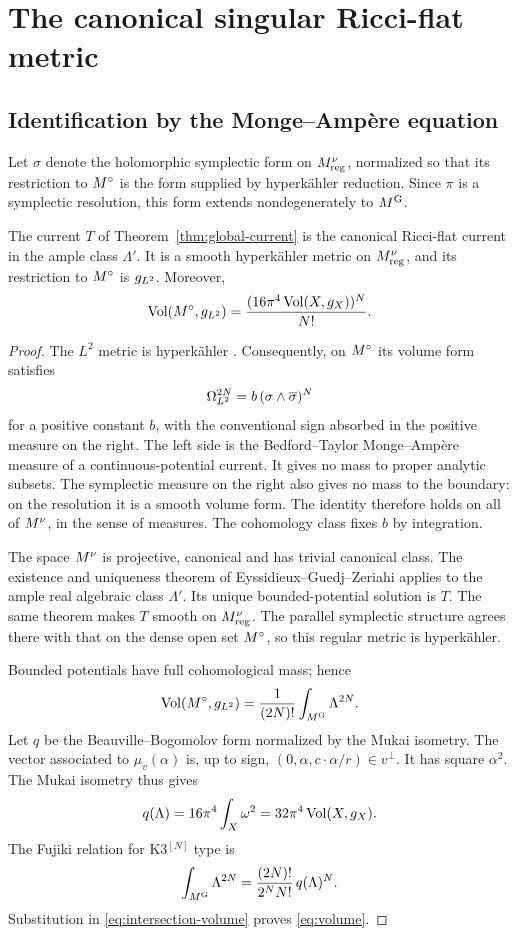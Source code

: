 \section{The canonical singular Ricci-flat metric}\label{sec:canonical}

\subsection{Identification by the Monge--Amp\`ere equation}
Let $\sigma$ denote the holomorphic symplectic form on $M^{\nu}_{\rm reg}$,
normalized so that its restriction to $M^{\circ}$ is the form supplied by
hyperk\"ahler reduction. Since $\pi$ is a symplectic resolution, this form
extends nondegenerately to $M^{\mathrm G}$.

\begin{theorem}\label{thm:canonical}
The current $T$ of Theorem~\ref{thm:global-current} is the canonical
Ricci-flat current in the ample class $\Lambda'$. It is a smooth
hyperk\"ahler metric on $M^{\nu}_{\rm reg}$, and its restriction to $M^{\circ}$ is
$g_{L^2}$. Moreover,
\begin{equation}\label{eq:volume}
 \operatorname{Vol}(M^{\circ},g_{L^2})=\frac{(16\pi^4\operatorname{Vol}(X,g_X))^N}{N!}.
\end{equation}
\end{theorem}
\begin{proof}
The $L^2$ metric is hyperk\"ahler \cite[Theorem~2.1]{Itoh88}. Consequently,
on $M^{\circ}$ its volume form satisfies
\[
 \Omega_{L^2}^{2N}=b\,(\sigma\wedge\overline\sigma)^N
\]
for a positive constant $b$, with the conventional sign absorbed in the
positive measure on the right. The left side is the Bedford--Taylor
Monge--Amp\`ere measure of a continuous-potential current. It gives no mass
to proper analytic subsets. The symplectic measure on the right also gives
no mass to the boundary: on the resolution it is a smooth volume form.
The identity therefore holds on all of $M^{\nu}$, in the sense of measures.
The cohomology class fixes $b$ by integration.

The space $M^{\nu}$ is projective, canonical and has trivial canonical class.
The existence and uniqueness theorem of Eyssidieux--Guedj--Zeriahi
\cite[Theorem~7.5 and Corollary~7.6]{EGZ09} applies to the ample real
algebraic class $\Lambda'$. Its unique bounded-potential solution is $T$.
The same theorem makes $T$ smooth on $M^{\nu}_{\rm reg}$. The parallel
symplectic structure agrees there with that on the dense open set $M^{\circ}$,
so this regular metric is hyperk\"ahler.

Bounded potentials have full cohomological mass; hence
\begin{equation}\label{eq:intersection-volume}
 \operatorname{Vol}(M^{\circ},g_{L^2})=\frac1{(2N)!}\int_{M^{\mathrm G}}\Lambda^{2N}.
\end{equation}
Let $q$ be the Beauville--Bogomolov form normalized by the Mukai isometry.
The vector associated to $\mu_v(\alpha)$ is, up to sign,
$(0,\alpha,c\cdot\alpha/r)\in v^\perp$. It has square $\alpha^2$.
The Mukai isometry \cite{OGr97,Yos01} thus gives
\[
 q(\Lambda)=16\pi^4\int_X\omega^2
           =32\pi^4\operatorname{Vol}(X,g_X).
\]
The Fujiki relation for K3$^{[N]}$ type is
\[
 \int_{M^{\mathrm G}}\Lambda^{2N}=
 \frac{(2N)!}{2^NN!}\,q(\Lambda)^N.
\]
Substitution in \eqref{eq:intersection-volume} proves \eqref{eq:volume}.
\end{proof}

